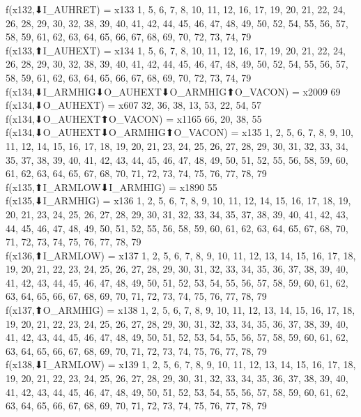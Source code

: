 f(x132,⬇I_AUHRET) = x133 {1, 5, 6, 7, 8, 10, 11, 12, 16, 17, 19, 20, 21, 22, 24, 26, 28, 29, 30, 32, 38, 39, 40, 41, 42, 44, 45, 46, 47, 48, 49, 50, 52, 54, 55, 56, 57, 58, 59, 61, 62, 63, 64, 65, 66, 67, 68, 69, 70, 72, 73, 74, 79} \\
f(x133,⬆I_AUHEXT) = x134 {1, 5, 6, 7, 8, 10, 11, 12, 16, 17, 19, 20, 21, 22, 24, 26, 28, 29, 30, 32, 38, 39, 40, 41, 42, 44, 45, 46, 47, 48, 49, 50, 52, 54, 55, 56, 57, 58, 59, 61, 62, 63, 64, 65, 66, 67, 68, 69, 70, 72, 73, 74, 79} \\
f(x134,⬇I_ARMHIG⬇O_AUHEXT⬇O_ARMHIG⬆O_VACON) = x2009 {69} \\
f(x134,⬇O_AUHEXT) = x607 {32, 36, 38, 13, 53, 22, 54, 57} \\
f(x134,⬇O_AUHEXT⬆O_VACON) = x1165 {66, 20, 38, 55} \\
f(x134,⬇O_AUHEXT⬇O_ARMHIG⬆O_VACON) = x135 {1, 2, 5, 6, 7, 8, 9, 10, 11, 12, 14, 15, 16, 17, 18, 19, 20, 21, 23, 24, 25, 26, 27, 28, 29, 30, 31, 32, 33, 34, 35, 37, 38, 39, 40, 41, 42, 43, 44, 45, 46, 47, 48, 49, 50, 51, 52, 55, 56, 58, 59, 60, 61, 62, 63, 64, 65, 67, 68, 70, 71, 72, 73, 74, 75, 76, 77, 78, 79} \\
f(x135,⬆I_ARMLOW⬇I_ARMHIG) = x1890 {55} \\
f(x135,⬇I_ARMHIG) = x136 {1, 2, 5, 6, 7, 8, 9, 10, 11, 12, 14, 15, 16, 17, 18, 19, 20, 21, 23, 24, 25, 26, 27, 28, 29, 30, 31, 32, 33, 34, 35, 37, 38, 39, 40, 41, 42, 43, 44, 45, 46, 47, 48, 49, 50, 51, 52, 55, 56, 58, 59, 60, 61, 62, 63, 64, 65, 67, 68, 70, 71, 72, 73, 74, 75, 76, 77, 78, 79} \\
f(x136,⬆I_ARMLOW) = x137 {1, 2, 5, 6, 7, 8, 9, 10, 11, 12, 13, 14, 15, 16, 17, 18, 19, 20, 21, 22, 23, 24, 25, 26, 27, 28, 29, 30, 31, 32, 33, 34, 35, 36, 37, 38, 39, 40, 41, 42, 43, 44, 45, 46, 47, 48, 49, 50, 51, 52, 53, 54, 55, 56, 57, 58, 59, 60, 61, 62, 63, 64, 65, 66, 67, 68, 69, 70, 71, 72, 73, 74, 75, 76, 77, 78, 79} \\
f(x137,⬆O_ARMHIG) = x138 {1, 2, 5, 6, 7, 8, 9, 10, 11, 12, 13, 14, 15, 16, 17, 18, 19, 20, 21, 22, 23, 24, 25, 26, 27, 28, 29, 30, 31, 32, 33, 34, 35, 36, 37, 38, 39, 40, 41, 42, 43, 44, 45, 46, 47, 48, 49, 50, 51, 52, 53, 54, 55, 56, 57, 58, 59, 60, 61, 62, 63, 64, 65, 66, 67, 68, 69, 70, 71, 72, 73, 74, 75, 76, 77, 78, 79} \\
f(x138,⬇I_ARMLOW) = x139 {1, 2, 5, 6, 7, 8, 9, 10, 11, 12, 13, 14, 15, 16, 17, 18, 19, 20, 21, 22, 23, 24, 25, 26, 27, 28, 29, 30, 31, 32, 33, 34, 35, 36, 37, 38, 39, 40, 41, 42, 43, 44, 45, 46, 47, 48, 49, 50, 51, 52, 53, 54, 55, 56, 57, 58, 59, 60, 61, 62, 63, 64, 65, 66, 67, 68, 69, 70, 71, 72, 73, 74, 75, 76, 77, 78, 79} \\

